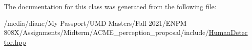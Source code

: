 The documentation for this class was generated from the following file\+:\begin{DoxyCompactItemize}
\item 
/media/diane/\+My Passport/\+U\+M\+D Masters/\+Fall 2021/\+E\+N\+P\+M 808\+X/\+Assignments/\+Midterm/\+A\+C\+M\+E\+\_\+perception\+\_\+proposal/include/\hyperlink{_human_detector_8hpp}{Human\+Detector.\+hpp}\end{DoxyCompactItemize}
